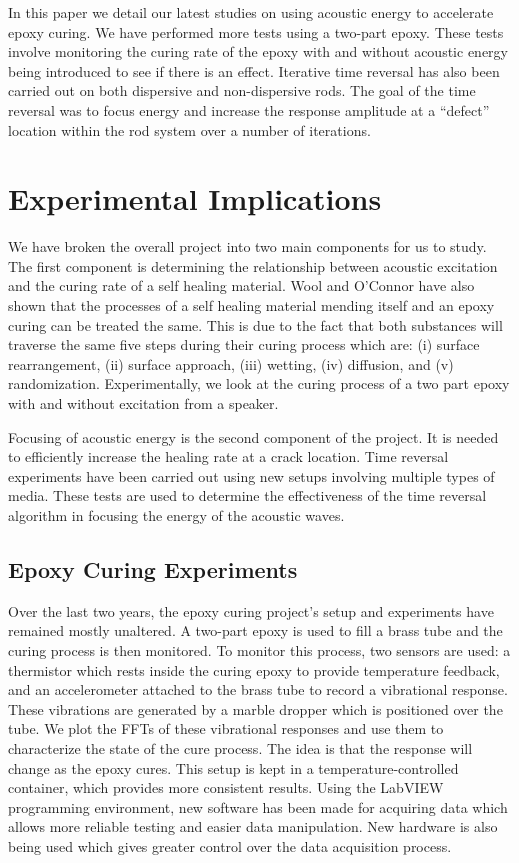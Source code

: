 \documentclass[a4paper]{spie}  %
\begin{document}
In this paper we detail our latest studies on using acoustic energy to accelerate epoxy curing. We have performed more tests using a two-part epoxy. These tests involve monitoring the curing rate of the epoxy with and without acoustic energy being introduced to see if there is an effect. Iterative time reversal has also been carried out on both dispersive and non-dispersive rods. The goal of the time reversal was to focus energy and increase the response amplitude at a ``defect'' location within the rod system over a number of iterations.

\section{Experimental Implications}
\label{sec:exp_imp}
We have broken the overall project into two main components for us to study. The first component is determining the relationship between acoustic excitation and the curing rate of a self healing material. Wool and O'Connor have also shown that the processes of a self healing material mending itself and an epoxy curing can be treated the same. This is due to the fact that both substances will traverse the same five steps during their curing process which are: (i) surface rearrangement, (ii) surface approach, (iii) wetting, (iv) diffusion, and (v) randomization. Experimentally, we look at the curing process of a two part epoxy with and without excitation from a speaker. 

Focusing of acoustic energy is the second component of the project. It is needed to efficiently increase the healing rate at a crack location. Time reversal experiments have been carried out using new setups involving multiple types of media. These tests are used to determine the effectiveness of the time reversal algorithm in focusing the energy of the acoustic waves.

\subsection{Epoxy Curing Experiments}

Over the last two years, the epoxy curing project's setup and experiments have remained mostly unaltered. A two-part epoxy is used to fill a brass tube and the curing process is then monitored. To monitor this process, two sensors are used: a thermistor which rests inside the curing epoxy to provide temperature feedback, and an accelerometer attached to the brass tube to record a vibrational response. These vibrations are generated by a marble dropper which is positioned over the tube. We plot the FFTs of these vibrational responses and use them to characterize the state of the cure process. The idea is that the response will change as the epoxy cures. This setup is kept in a temperature-controlled container, which provides more consistent results. Using the LabVIEW programming environment, new software has been made for acquiring data which allows more reliable testing and easier data manipulation. New hardware is also being used which gives greater control over the data acquisition process. 
\end{document}
